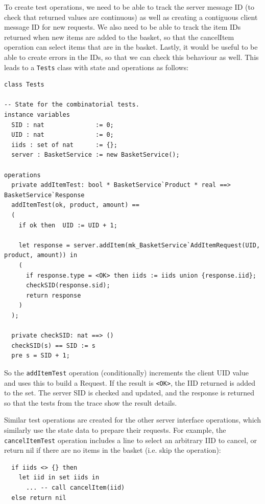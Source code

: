 \documentclass{overturerepchap}
\begin{document}
To create test operations, we need to be able to track the server message ID (to
check that returned values are continuous) as well as creating a contiguous
client message ID for new requests. We also need to be able to track the item
IDs returned when new items are added to the basket, so that the cancelItem
operation can select items that are in the basket. Lastly, it would be useful to
be able to create errors in the IDs, so that we can check this behaviour as
well. This leads to a \texttt{Tests} class with state and operations as
follows:

\scriptsize
\begin{lstlisting}
class Tests

-- State for the combinatorial tests.
instance variables
  SID : nat              := 0;
  UID : nat              := 0;
  iids : set of nat      := {};
  server : BasketService := new BasketService();

operations
  private addItemTest: bool * BasketService`Product * real ==> BasketService`Response
  addItemTest(ok, product, amount) ==
  (
    if ok then  UID := UID + 1;

    let response = server.addItem(mk_BasketService`AddItemRequest(UID, product, amount)) in
    (
      if response.type = <OK> then iids := iids union {response.iid};
      checkSID(response.sid);
      return response
    )
  );

  private checkSID: nat ==> ()
  checkSID(s) == SID := s
  pre s = SID + 1;

\end{lstlisting}
\normalsize

\noindent So the \texttt{addItemTest} operation (conditionally) increments the
client UID value and uses this to build a Request. If the result is
\texttt{<OK>}, the IID returned is added to the set. The server SID is checked
and updated, and the response is returned so that the tests from the trace show
the result details.

Similar test operations are created for the other server interface operations,
which similarly use the state data to prepare their requests. For example, the
\texttt{cancelItemTest} operation includes a line to select an arbitrary IID to
cancel, or return nil if there are no items in the basket (i.e. skip the
operation):

\scriptsize
\begin{lstlisting}
  if iids <> {} then
    let iid in set iids in
      ... -- call cancelItem(iid)
  else return nil
\end{lstlisting}
\normalsize
\end{document}
